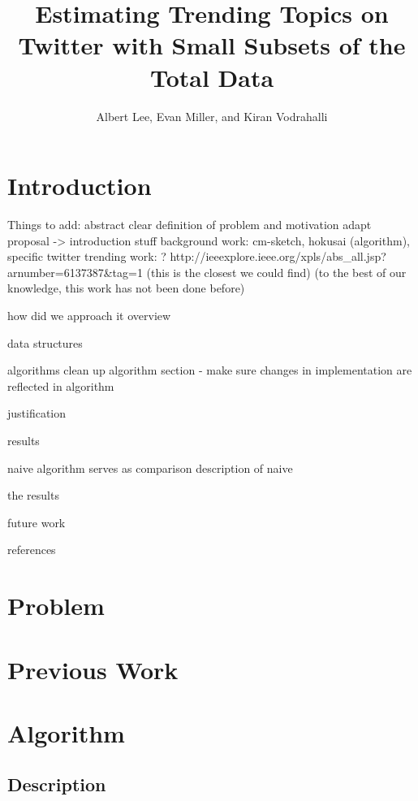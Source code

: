 \documentclass[a4paper,12pt]{article}
\begin{document}
\title{Estimating Trending Topics on Twitter with Small Subsets of the Total Data}

\author{Albert Lee, Evan Miller, and Kiran Vodrahalli}

\maketitle

\section{Introduction}


Things to add:
abstract
clear definition of problem and motivation 
adapt proposal -> introduction stuff
background work: cm-sketch, hokusai (algorithm), specific twitter trending work: ? 
http://ieeexplore.ieee.org/xpls/abs_all.jsp?arnumber=6137387&tag=1 
(this is the closest we could find)
(to the best of our knowledge, this work has not been done before)

how did we approach it 
overview

data structures

algorithms
clean up algorithm section
- make sure changes in implementation are reflected in algorithm

justification


results

naive algorithm serves as comparison
description of naive

the results

future work

references



\section{Problem}

\section{Previous Work}

\section{Algorithm}

\subsection{Description}
\end{document}
